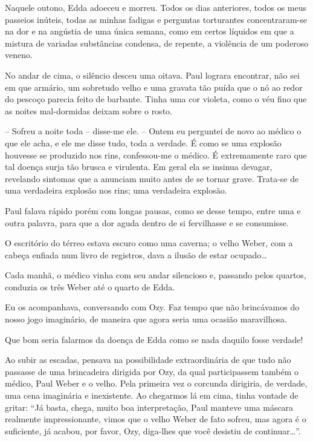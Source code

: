 Naquele outono, Edda adoeceu e morreu. Todos os dias anteriores, todos os meus passeios inúteis, todas as minhas fadigas e perguntas torturantes concentraram-se na dor e na angústia de uma única semana, como em certos líquidos em que a mistura de variadas substâncias condensa, de repente, a violência de um poderoso veneno. 

No andar de cima, o silêncio desceu uma oitava. Paul lograra encontrar, não sei em que armário, um sobretudo velho e uma gravata tão puída que o nó ao redor do pescoço parecia feito de barbante. Tinha uma cor violeta, como o véu fino que as noites mal-dormidas deixam sobre o rosto.

-- Sofreu a noite toda -- disse-me ele. -- Ontem eu perguntei de novo ao médico o que ele acha, e ele me disse tudo, toda a verdade. É como se uma explosão houvesse se produzido nos rins, confessou-me o médico. É extremamente raro que tal doença surja tão brusca e virulenta. Em geral ela se insinua devagar, revelando sintomas que a anunciam muito antes de se tornar grave. Trata-se de uma verdadeira explosão nos rins; uma verdadeira explosão.

Paul falava rápido porém com longas pausas, como se desse tempo, entre uma e outra palavra, para que a dor aguda dentro de si fervilhasse e se consumisse.

O escritório do térreo estava escuro como uma caverna; o velho Weber, com a cabeça enfiada num livro de registros, dava a ilusão de estar ocupado\dots

Cada manhã, o médico vinha com seu andar silencioso e, passando pelos quartos, conduzia os três Weber até o quarto de Edda.

Eu os acompanhava, conversando com Ozy. Faz tempo que não brincávamos do nosso jogo imaginário, de maneira que agora seria uma ocasião maravilhosa.

Que bom seria falarmos da doença de Edda como se nada daquilo fosse verdade!

Ao subir as escadas, pensava na possibilidade extraordinária de que tudo não passasse de uma brincadeira dirigida por Ozy, da qual participassem também o médico, Paul Weber e o velho. Pela primeira vez o corcunda dirigiria, de verdade, uma cena imaginária e inexistente. Ao chegarmos lá em cima, tinha vontade de gritar: ``Já basta, chega, muito boa interpretação, Paul manteve uma máscara realmente impressionante, vimos que o velho Weber de fato sofreu, mas agora é o suficiente, já acabou, por favor, Ozy, diga-lhes que você desistiu de continuar\dots''.

